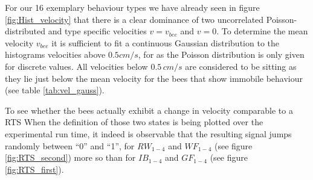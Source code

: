 
For our 16 exemplary behaviour types we have already seen in figure \ref{fig:Hist_velocity} that there is a clear dominance of two uncorrelated Poisson-distributed and type specific velocities $v = v_{bee}$ and $v = 0$. To determine the mean velocity $v_{bee}$ it is sufficient to fit a continuous Gaussian distribution to the histograms velocities above $0.5 cm/s$, for as the Poisson distribution is only given for discrete values. All velocities below $0.5 \,cm/s$ are considered to be sitting as they lie just below the mean velocity for the bees that show immobile behaviour (see table \ref{tab:vel_gauss}).


To see whether the bees actually exhibit a change in velocity comparable to a RTS
When the definition of those two states is being plotted over the experimental run time, it indeed is observable that the resulting signal jumps randomly between ``0'' and ``1'', for $RW_{1-4}$ and $WF_{1-4}$ (see figure \ref{fig:RTS_second}) more so than for $IB_{1-4}$ and $GF_{1-4}$ (see figure \ref{fig:RTS_first}).

